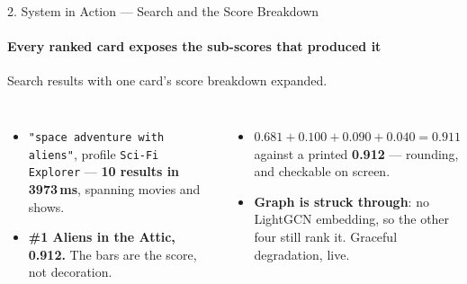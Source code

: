 %
%

\begin{frame}[shrink]{2. System in Action --- Search and the Score Breakdown}
\framesubtitle{Every ranked card exposes the sub-scores that produced it}
\vspace{-1mm}
\begin{center}
%
{Search results with one card's score breakdown expanded.}
\end{center}
\vspace{-1mm}
\begin{columns}[T]
\begin{itemize}\scriptsize\setlength{\itemsep}{2pt}
  \item \texttt{"space adventure with aliens"}, profile \texttt{Sci-Fi Explorer} --- \textbf{10
        results in 3973\,ms}, spanning movies and shows.
  \item \textbf{\#1 Aliens in the Attic, 0.912.} The bars are the score, not decoration.
\end{itemize}

\begin{itemize}\scriptsize\setlength{\itemsep}{2pt}
  \item $0.681 + 0.100 + 0.090 + 0.040 = \mathbf{0.911}$ against a printed \textbf{0.912} ---
        rounding, and checkable on screen.
  \item \textcolor{amritaMaroon}{\textbf{Graph is struck through}}: no LightGCN embedding, so the
        other four still rank it. Graceful degradation, live.
\end{itemize}
\end{columns}
\end{frame}


